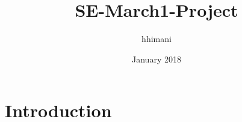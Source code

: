 \documentclass{article}
\title{SE-March1-Project}
\author{hhimani }
\date{January 2018}
\begin{document}
\maketitle

\section{Introduction}
\end{document}
